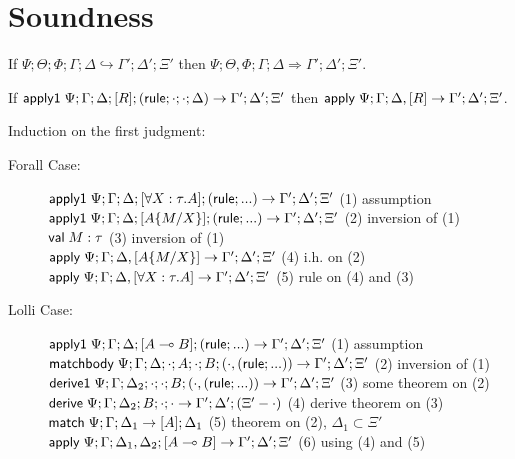 \documentclass[9pt]{article}
\begin{document}
\section{Soundness}

If $\Psi; \Theta ; \Phi ; \Gamma ; \Delta \hookrightarrow \Gamma' ; \Delta'; \Xi'$ then $\Psi; \Theta, \Phi ; \Gamma; \Delta \Rightarrow \Gamma' ; \Delta' ; \Xi'$.


If $\mathsf{apply1} \; \Psi; \Gamma ; \Delta; [R]; (\mathsf{rule}; \cdot; \cdot; \Delta) \rightarrow \Gamma'; \Delta'; \Xi'$ then $\mathsf{apply} \; \Psi; \Gamma; \Delta, [R] \rightarrow \Gamma'; \Delta'; \Xi'$.

Induction on the first judgment:

\begin{description}

\item[Forall Case:]

$\mathsf{apply1} \; \Psi; \Gamma; \Delta; [\forall X : \tau. A]; (\mathsf{rule}; ...) \rightarrow \Gamma'; \Delta'; \Xi'$ \hfill (1) assumption \\
$\mathsf{apply1} \; \Psi; \Gamma; \Delta; [A\{M/X\}]; (\mathsf{rule}; ...) \rightarrow \Gamma'; \Delta' ; \Xi' $ \hfill (2) inversion of (1) \\
$\mathsf{val} \; M : \mathsf{\tau}$   \hfill (3) inversion of (1) \\
$\mathsf{apply} \; \Psi; \Gamma; \Delta, [A\{M/X\}] \rightarrow \Gamma'; \Delta'; \Xi'$ \hfill (4) i.h. on (2) \\
$\mathsf{apply} \; \Psi ; \Gamma; \Delta, [\forall X: \tau. A] \rightarrow \Gamma'; \Delta'; \Xi'$ \hfill (5) rule on (4) and (3) \\

\item[Lolli Case:]

$\mathsf{apply1} \; \Psi ; \Gamma; \Delta; [A \multimap B]; (\mathsf{rule} ; ...) \rightarrow \Gamma'; \Delta'; \Xi'$ \hfill (1) assumption \\
$\mathsf{matchbody} \; \Psi; \Gamma; \Delta; \cdot ; A ; \cdot ; B ; (\cdot, (\mathsf{rule}; ...)) \rightarrow \Gamma'; \Delta'; \Xi'$ \hfill (2) inversion of (1) \\
$\mathsf{derive1} \; \Psi; \Gamma; \Delta_2; \cdot; \cdot; B; (\cdot, (\mathsf{rule}; ...)) \rightarrow \Gamma'; \Delta'; \Xi'$ \hfill (3) some theorem on (2) \\
$\mathsf{derive} \; \Psi; \Gamma; \Delta_2; B; \cdot; \cdot \rightarrow \Gamma'; \Delta'; (\Xi' - \cdot)$ \hfill (4) derive theorem on (3) \\
$\mathsf{match} \; \Psi; \Gamma; \Delta_1 \rightarrow [A]; \Delta_1$ \hfill (5) theorem on (2), $\Delta_1 \subset \Xi'$ \\
$\mathsf{apply} \; \Psi; \Gamma; \Delta_1, \Delta_2 ; [A \multimap B] \rightarrow \Gamma'; \Delta'; \Xi'$ \hfill (6) using (4) and (5) \\
\end{description}
\end{document}
